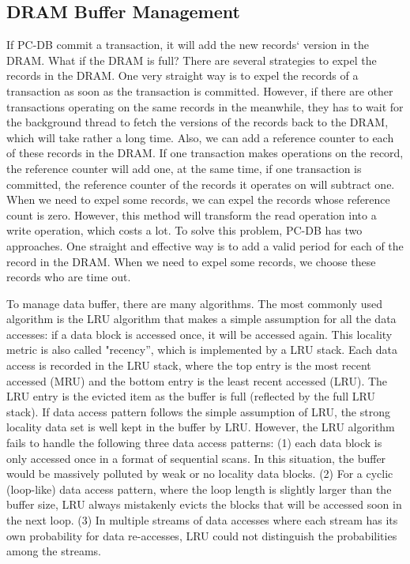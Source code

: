 
    
\subsection{DRAM Buffer Management}
If PC-DB commit a transaction, it will add the new records` version in the DRAM. What if the DRAM is full? There are several strategies to expel the records in the DRAM. One very straight way is to expel the records of a transaction as soon as the transaction is committed. However, if there are other transactions operating on the same records in the meanwhile, they has to wait for the background thread to fetch the versions of the records back to the DRAM, which will take rather a long time. Also, we can  add a reference counter to each of these records in the DRAM. If one transaction makes operations on the record, the reference counter will add one, at the same time, if one transaction is committed, the reference counter of the records it operates on will subtract one. When we need to expel some records, we can expel the records whose reference count is zero. However, this method will transform the read operation into a write operation, which costs a lot. To solve this problem, PC-DB has two approaches. One straight and effective way is to add a valid period for each of the record in the DRAM. When we need to expel some records, we choose these records who are time out. 

To manage data buffer, there are many algorithms. The most commonly used algorithm is the LRU algorithm that makes a simple assumption for all the data accesses: if a data block is accessed once, it will be accessed again. This locality metric is also called "recency'', which is implemented by a LRU stack. Each data access is recorded in the LRU stack, where the top entry is the most recent accessed (MRU) and the bottom entry is the least recent accessed (LRU). The LRU entry is the evicted item as the buffer is full (reflected by the full LRU stack). If data access pattern follows the simple assumption of LRU, the strong locality data set is well kept in the buffer by LRU. However, the LRU algorithm fails to handle the following three data access patterns: (1) each data block is only accessed once in a format of sequential scans. In this situation, the buffer would be massively polluted by weak or no locality data blocks. (2) For a cyclic (loop-like) data access pattern, where the loop length is slightly larger than the buffer size, LRU always mistakenly evicts the blocks that will be accessed soon in the next loop. (3) In multiple streams of data accesses where each stream has its own probability for data re-accesses, LRU could not distinguish the probabilities among the streams. 

